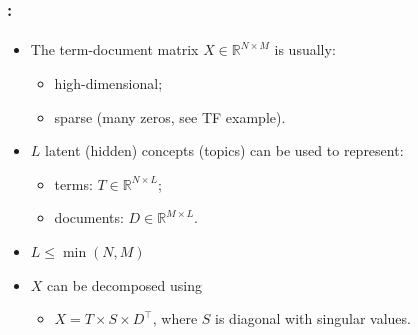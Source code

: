 \documentclass[xcolor=table]{beamer}
\begin{document}
\begin{frame}
	\frametitle{\insertshortsubtitle: \insertsection}
	\framesubtitle{\insertsubsection}

	\begin{itemize}
		\item The term-document matrix $X \in \mathbb{R}^{N \times M}$ is usually:
		\begin{itemize}
			\item high-dimensional;
			\item sparse (many zeros, see TF example).
		\end{itemize}
		\item $L$ latent (hidden) concepts (topics) can be used to represent:
		\begin{itemize}
			\item terms: $T \in \mathbb{R}^{N \times L}$;
			\item documents: $D \in \mathbb{R}^{M \times L}$.
		\end{itemize}
		\item $L \le \min(N, M)$
		\item $X$ can be decomposed using 
		\begin{itemize}
			\item $X = T \times S \times D^\top$, where $S$ is diagonal with singular values.
		\end{itemize}
	\end{itemize}

\end{frame}
\end{document}
